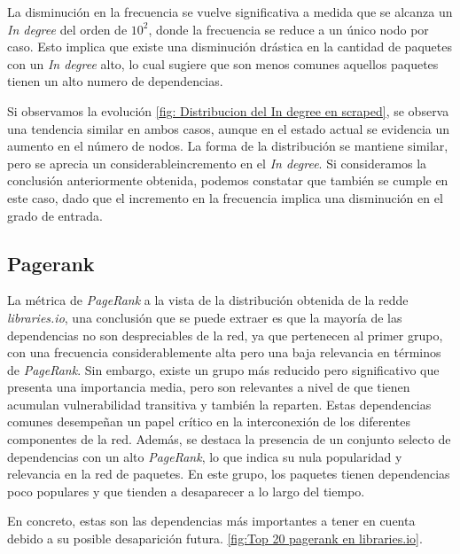 La disminución en la frecuencia se vuelve significativa a medida que se alcanza un \textit{In degree} del orden
de $10^2$, donde la frecuencia se reduce a un único nodo por caso. Esto implica que existe una disminución drástica
en la cantidad de paquetes con un \textit{In degree} alto, lo cual sugiere que son menos comunes aquellos paquetes
tienen un alto numero de dependencias.

Si observamos la evolución \ref{fig: Distribucion del In degree en scraped}, se observa una tendencia similar en ambos casos,
aunque en el estado actual se evidencia un aumento en el número de nodos. La forma de la distribución se mantiene similar,
pero se aprecia un considerableincremento en el \textit{In degree}. Si consideramos la conclusión anteriormente obtenida, podemos constatar que
también se cumple en este caso, dado que el incremento en la frecuencia implica una disminución en el grado de entrada.

\subsection{Pagerank}

La métrica de \textit{PageRank} a la vista de la distribución obtenida de la redde \textit{libraries.io}, una conclusión
que se puede extraer es que la mayoría de las dependencias no son despreciables de la red, ya que pertenecen al primer grupo,
con una frecuencia considerablemente alta pero una baja relevancia en términos de \textit{PageRank}. Sin embargo,
existe un grupo más reducido pero significativo que presenta una importancia media, pero son relevantes a nivel de que
tienen acumulan vulnerabilidad transitiva y también la reparten. Estas dependencias comunes desempeñan un papel crítico
en la interconexión de los diferentes componentes de la red.
Además, se destaca la presencia de un conjunto selecto de dependencias con un alto \textit{PageRank}, lo que indica su nula popularidad
y relevancia en la red de paquetes. En este grupo, los paquetes tienen dependencias poco populares y que tienden a desaparecer a lo largo del tiempo.

En concreto, estas son las dependencias más importantes a tener en cuenta debido a su posible desaparición futura. \ref{fig:Top 20 pagerank en libraries.io}.

